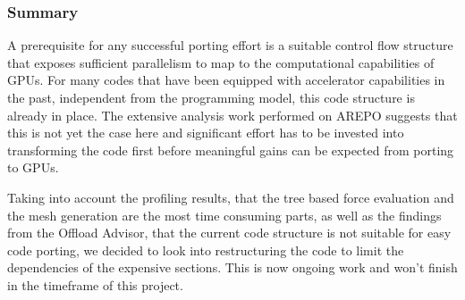 \documentclass[../main]{subfiles}
\begin{document}
\subsubsection{Summary}
A prerequisite for any successful porting effort is a suitable control flow structure that exposes sufficient parallelism to map to the computational capabilities of GPUs.
For many codes that have been equipped with accelerator capabilities in the past, independent from the programming model, this code structure is already in place.
The extensive analysis work performed on AREPO suggests that this is not yet the case here and significant effort has to be invested into transforming the code first before meaningful gains can be expected from porting to GPUs.

Taking into account the profiling results, that the tree based force evaluation and the mesh generation are the most time consuming parts, as well as the findings from the Offload Advisor, that the current code structure is not suitable for easy code porting, we decided to look into restructuring the code to limit the dependencies of the expensive sections. This is now ongoing work and won't finish in the timeframe of this project. 





\end{document}
